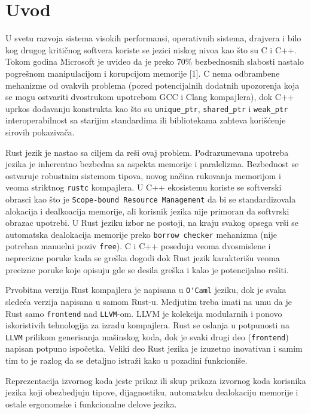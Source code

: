 \section{Uvod}

U svetu razvoja sistema visokih performansi, operativnih sistema, drajvera i bilo kog drugog kritičnog softvera koriste se jezici niskog nivoa kao što su C i C++.
Tokom godina Microsoft je uvideo da je preko 70\% bezbednosnih slabosti nastalo pogrešnom manipulacijom i korupcijom memorije [1]. 
C nema odbrambene mehanizme od ovakvih problema (pored potencijalnih dodatnih upozorenja koja se mogu ostvariti dvostrukom upotrebom GCC i Clang kompajlera), dok C++ uprkos dodavanju konstrukta kao što su \verb|unique_ptr|, \verb|shared_ptr| i \verb|weak_ptr| interoperabilnost sa starijim standardima ili bibliotekama zahteva korišćenje sirovih pokazivača. 

Rust jezik je nastao sa ciljem da reši ovaj problem. Podrazumevana upotreba jezika je inherentno bezbedna sa aspekta memorije i paralelizma. Bezbednost se ostvaruje robustnim sistemom tipova, novog načina rukovanja memorijom i veoma striktnog \verb|rustc| kompajlera.
U C++ ekosistemu koriste se softverski obrasci kao što je \verb|Scope-bound Resource Management| da bi se standardizovala alokacija i dealkoacija memorije, ali korisnik jezika nije primoran da softvrski obrazac upotrebi. U Rust jeziku izbor ne postoji, na kraju svakog opsega vrši se automatska dealokacija memorije preko \verb|borrow checker| mehanizma (nije potreban manuelni poziv \verb|free|).
C i C++ poseduju veoma dvosmislene i neprecizne poruke kada se greška dogodi dok Rust jezik karakterišu veoma precizne poruke koje opisuju gde se desila greška i kako je potencijalno rešiti.

Prvobitna verzija Rust kompajlera je napisana u \verb|O'Caml| jeziku, dok je svaka sledeća verzija napisana u samom Rust-u.
Medjutim treba imati na umu da je Rust samo \verb|frontend| nad \verb|LLVM|-om. LLVM je kolekcija modularnih i ponovo iskoristivih tehnologija za izradu kompajlera. Rust se oslanja u potpunosti na \verb|LLVM| prilikom generisanja mašinskog koda, dok je svaki drugi deo
(\verb|frontend|) napisan potpuno ispočetka.
Veliki deo Rust jezika je izuzetno inovativan i samim tim to je razlog da se detaljno istraži kako u pozadini funkcioniše.

Reprezentacija izvornog koda jeste prikaz ili skup prikaza izvornog koda korisnika jezika koji obezbedjuju tipove, dijagnostiku,
automatsku dealokaciju memorije i ostale ergonomske i funkcionalne delove jezika.
\newpage

